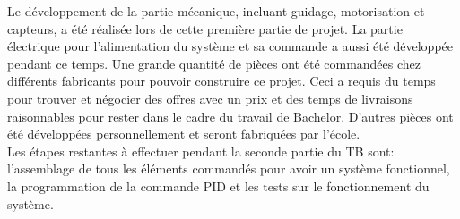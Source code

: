 
Le développement de la partie mécanique, incluant guidage, motorisation et capteurs, a été réalisée lors de cette première partie de projet.
La partie électrique pour l'alimentation du système et sa commande a aussi été développée pendant ce temps. Une grande quantité de pièces
ont été commandées chez différents fabricants pour pouvoir construire ce projet. Ceci a requis du temps pour trouver et négocier des offres
avec un prix et des temps de livraisons raisonnables pour rester dans le cadre du travail de Bachelor. D'autres pièces ont été développées
personnellement et seront fabriquées par l'école.\\

Les étapes restantes à effectuer pendant la seconde partie du \acrshort{TB} sont: l'assemblage de tous les éléments commandés pour avoir un
système fonctionnel, la programmation de la commande \gls{PID} et les tests sur le fonctionnement du système.